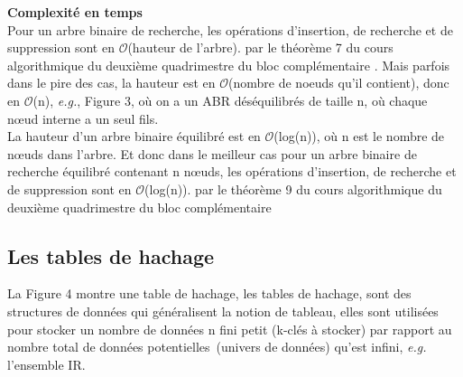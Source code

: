 \documentclass[hidelinks,a4paper,12pt]{article}
\def\nbR{\ensuremath{\mathrm{I\! R}}}
\begin{document}
\textbf {Complexité en temps} \\
Pour un arbre binaire de recherche, les opérations d’insertion, de recherche et de suppression sont en $\mathcal{O}$(hauteur de l'arbre). par le théorème 7 du cours algorithmique du deuxième quadrimestre du bloc complémentaire \cite{NoteCours2}. Mais parfois dans le pire des cas, la hauteur est en $\mathcal{O}$(nombre de noeuds qu'il contient), donc en $\mathcal{O}$(n), \textit{e.g.}, Figure 3, où on a un ABR déséquilibrés de taille n, où chaque nœud interne a un seul fils. \cite{NoteCours2}\\[0.3cm]
La hauteur d'un arbre binaire équilibré est en  $\mathcal{O}$(log(n)), où n est le nombre de nœuds dans l’arbre. Et donc dans le meilleur cas pour un arbre binaire de recherche équilibré contenant n nœuds, les opérations d’insertion, de recherche et de suppression sont en $\mathcal{O}$(log(n)). par le théorème 9 du cours algorithmique du deuxième quadrimestre du bloc complémentaire \cite{NoteCours2}\\



\newpage
	\subsection{Les tables de hachage}
	
	La Figure 4 montre une table de hachage, les tables de hachage, sont des structures de données qui généralisent la notion de tableau, elles sont utilisées pour stocker un nombre de données n fini petit (k-clés à stocker) par rapport au nombre total de données potentielles (univers de données) qu’est infini, \textit{e.g.} l’ensemble $\nbR$. 
	
\end{document}
